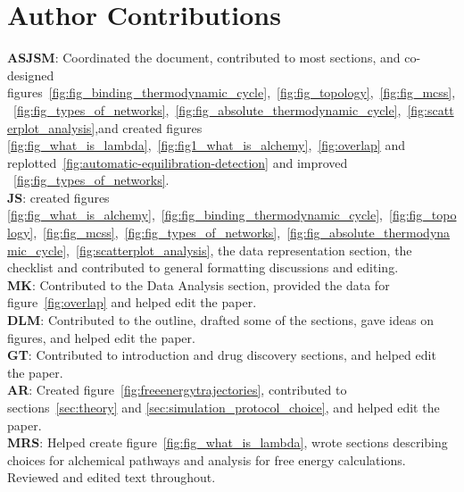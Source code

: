 \documentclass[9pt,bestpractices]{livecoms}
\begin{document}
\section*{Author Contributions}
%
\textbf{ASJSM}: Coordinated the document, contributed to most sections, and co-designed figures~\ref{fig:fig_binding_thermodynamic_cycle},~\ref{fig:fig_topology},~\ref{fig:fig_mcss},~\ref{fig:fig_types_of_networks},~\ref{fig:fig_absolute_thermodynamic_cycle},~\ref{fig:scatterplot_analysis},and created figures \ref{fig:fig_what_is_lambda},~\ref{fig:fig1_what_is_alchemy},~\ref{fig:overlap} and replotted~\ref{fig:automatic-equilibration-detection} and improved ~\ref{fig:fig_types_of_networks}.\\
\textbf{JS}: created figures \ref{fig:fig_what_is_alchemy},~\ref{fig:fig_binding_thermodynamic_cycle},~\ref{fig:fig_topology},~\ref{fig:fig_mcss},~\ref{fig:fig_types_of_networks},~\ref{fig:fig_absolute_thermodynamic_cycle},~\ref{fig:scatterplot_analysis}, the data representation section, the checklist and contributed to general formatting discussions and editing.\\
\textbf{MK}: Contributed to the Data Analysis section, provided the data for figure~\ref{fig:overlap} and helped edit the paper.\\
\textbf{DLM}: Contributed to the outline, drafted some of the sections, gave ideas on figures, and helped edit the paper.\\
\textbf{GT}: Contributed to introduction and drug discovery sections, and helped edit the paper.\\
\textbf{AR}: Created figure~\ref{fig:freeenergytrajectories}, contributed to sections~\ref{sec:theory} and \ref{sec:simulation_protocol_choice}, and helped edit the paper.\\
\textbf{MRS}: Helped create figure~\ref{fig:fig_what_is_lambda}, wrote sections describing choices for alchemical pathways and analysis for free energy calculations. Reviewed and edited text throughout.\\
\end{document}
